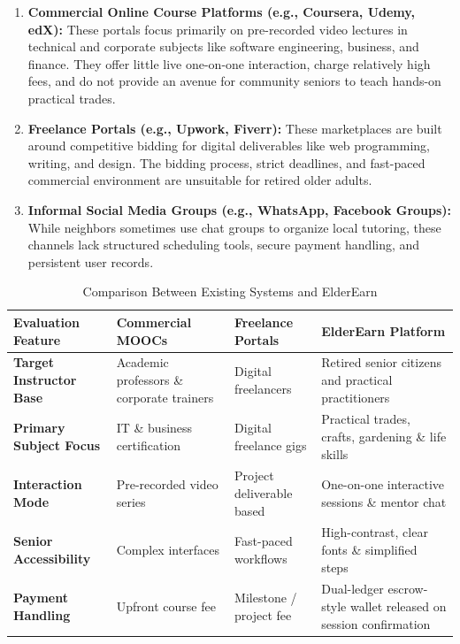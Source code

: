 \documentclass[12pt,a4paper]{report}
\begin{document}
\begin{enumerate}[leftmargin=1.5em, itemsep=2pt]
  \item \textbf{Commercial Online Course Platforms (e.g., Coursera, Udemy, edX):} These portals focus primarily on pre-recorded video lectures in technical and corporate subjects like software engineering, business, and finance. They offer little live one-on-one interaction, charge relatively high fees, and do not provide an avenue for community seniors to teach hands-on practical trades.
  \item \textbf{Freelance Portals (e.g., Upwork, Fiverr):} These marketplaces are built around competitive bidding for digital deliverables like web programming, writing, and design. The bidding process, strict deadlines, and fast-paced commercial environment are unsuitable for retired older adults.
  \item \textbf{Informal Social Media Groups (e.g., WhatsApp, Facebook Groups):} While neighbors sometimes use chat groups to organize local tutoring, these channels lack structured scheduling tools, secure payment handling, and persistent user records.
\end{enumerate}

\begin{table}[H]
\centering
\small
\caption{Comparison Between Existing Systems and ElderEarn}
\label{tab:system_comparison}
\begin{tabularx}{\textwidth}{|L{3.2cm}|L{3.2cm}|L{3.2cm}|J|}
\hline
\textbf{Evaluation Feature} & \textbf{Commercial MOOCs} & \textbf{Freelance Portals} & \textbf{ElderEarn Platform} \\ \hline
\textbf{Target Instructor Base} & Academic professors \& corporate trainers & Digital freelancers & Retired senior citizens and practical practitioners \\ \hline
\textbf{Primary Subject Focus} & IT \& business certification & Digital freelance gigs & Practical trades, crafts, gardening \& life skills \\ \hline
\textbf{Interaction Mode} & Pre-recorded video series & Project deliverable based & One-on-one interactive sessions \& mentor chat \\ \hline
\textbf{Senior Accessibility} & Complex interfaces & Fast-paced workflows & High-contrast, clear fonts \& simplified steps \\ \hline
\textbf{Payment Handling} & Upfront course fee & Milestone / project fee & Dual-ledger escrow-style wallet released on session confirmation \\ \hline
\end{tabularx}
\end{table}
\end{document}
